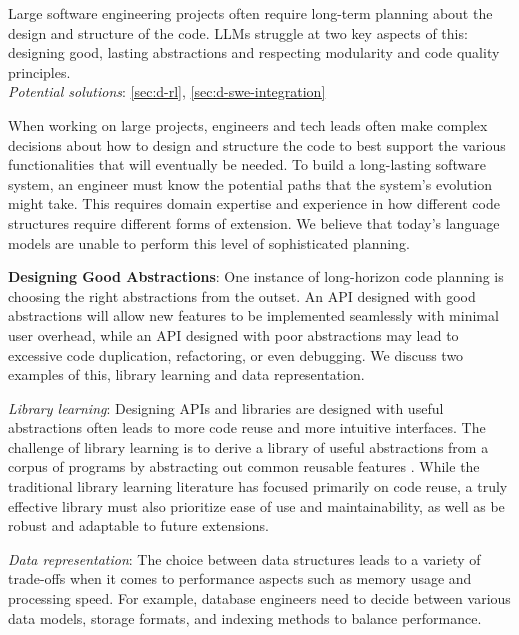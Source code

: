 \begin{tcolorbox}[colback=lightgreen, boxrule=0pt, arc=5pt, outer arc=5pt, after skip=10pt plus 2pt]
Large software engineering projects often require long-term planning about the design and structure of the code. LLMs struggle at two key aspects of this: designing good, lasting abstractions and respecting modularity and code quality principles.
\newline \\
\textit{Potential solutions}: \ref{sec:d-rl}, \ref{sec:d-swe-integration}
\end{tcolorbox}

When working on large projects, engineers and tech leads often make complex decisions about how to design and structure the code to best support the various functionalities that will eventually be needed. To build a long-lasting software system, an engineer must know the potential paths that the system's evolution might take. This requires domain expertise and experience in how different code structures require different forms of extension. We believe that today's language models are unable to perform this level of sophisticated planning.

\textbf{Designing Good Abstractions}:
One instance of long-horizon code planning is choosing the right abstractions from the outset. An API designed with good abstractions will allow new features to be implemented seamlessly with minimal user overhead, while an API designed with poor abstractions may lead to excessive code duplication, refactoring, or even debugging. We discuss two examples of this, library learning and data representation.

\textit{Library learning}: Designing APIs and libraries are designed with useful abstractions often leads to more code reuse and more intuitive interfaces. The challenge of library learning is to derive a library of useful abstractions from a corpus of programs by abstracting out common reusable features \citep{ellis2021dreamcoder,10.5555/3692070.3693967,10.1145/3571234}. While the traditional library learning literature has focused primarily on code reuse, a truly effective library must also prioritize ease of use and maintainability, as well as be robust and adaptable to future extensions. %

\textit{Data representation}: The choice between data structures leads to a variety of trade-offs when it comes to performance aspects such as memory usage and processing speed. For example, database engineers need to decide between various data models, storage formats, and indexing methods to balance performance. 


